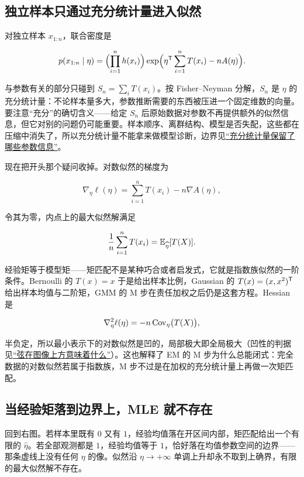 \subsection{独立样本只通过充分统计量进入似然}

对独立样本 \(x_{1:n}\)，联合密度是

\[
p(x_{1:n}\mid\eta)
=\Bigl(\prod_{i=1}^nh(x_i)\Bigr)
\exp\Bigl(\eta^{\mathsf{T}}\sum_{i=1}^nT(x_i)-nA(\eta)\Bigr).
\]

与参数有关的部分只碰到 \(S_n=\sum_iT(x_i)\)。按 Fisher--Neyman 分解，\(S_n\) 是 \(\eta\) 的充分统计量：不论样本量多大，参数推断需要的东西被压进一个固定维数的向量。要注意``充分''的确切含义——给定 \(S_n\) 后原始数据对参数不再提供额外的似然信息，但它对别的问题仍可能重要。样本顺序、离群结构、模型是否失配，这些都在压缩中消失了，所以充分统计量不能拿来做模型诊断，边界见\hyperref[sec:11-Mathematical-Statistics/03-Sufficient-Statistics-and-Information/01]{``充分统计量保留了哪些参数信息''}。

现在把开头那个疑问收掉。对数似然的梯度为

\[
\nabla_\eta\ell(\eta)=\sum_{i=1}^nT(x_i)-n\nabla A(\eta),
\]

令其为零，内点上的最大似然解满足

\[
\frac1n\sum_{i=1}^nT(x_i)=\mathbb{E}_{\widehat\eta}[T(X)].
\]

经验矩等于模型矩——矩匹配不是某种巧合或者启发式，它就是指数族似然的一阶条件。Bernoulli 的 \(T(x)=x\) 于是给出样本比例，Gaussian 的 \(T(x)=(x,x^2)^{\mathsf{T}}\) 给出样本均值与二阶矩，GMM 的 M 步在责任加权之后仍是这套方程。Hessian 是

\[
\nabla_\eta^2\ell(\eta)=-n\operatorname{Cov}_\eta\bigl(T(X)\bigr),
\]

半负定，所以最小表示下的对数似然是凹的，局部极大即全局极大（凹性的判据见\hyperref[sec:09-Convex-Optimization/03-Convex-Functions/01]{``弦在图像上方意味着什么''}）。这也解释了 EM 的 M 步为什么总能闭式：完全数据的对数似然若属于指数族，M 步不过是在加权的充分统计量上再做一次矩匹配。

\subsection{当经验矩落到边界上，MLE 就不存在}

回到右图。若样本里既有 \(0\) 又有 \(1\)，经验均值落在开区间内部，矩匹配给出一个有限的 \(\widehat\eta\)。若全部观测都是 \(1\)，经验均值等于 \(1\)，恰好落在均值参数空间的边界——那条虚线上没有任何 \(\eta\) 的像。似然沿 \(\eta\to+\infty\) 单调上升却永不取到上确界，有限的最大似然解不存在。

